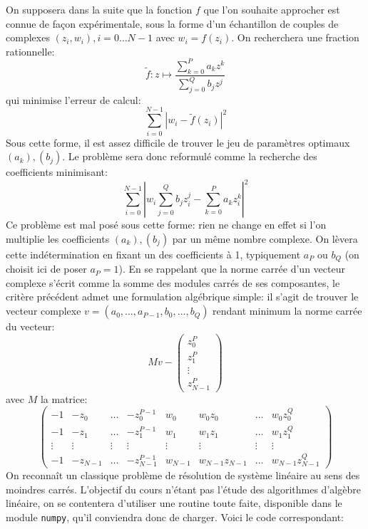 On supposera dans la suite que la fonction $f$ que l'on souhaite approcher est connue de façon expérimentale, sous la forme d'un échantillon de couples de complexes $(z_i,w_i), i=0 \dots N-1$ avec $w_i = f\left(z_i\right)$. On recherchera une fraction rationnelle:
\[
\widetilde{f} \colon z \mapsto \frac{\sum_{k=0}^P a_k z^k}{\sum_{j=0}^Q b_j z^j}
\]
qui minimise l'erreur de calcul:
\[
\sum_{i=0}^{N-1} \left|w_i - \widetilde{f}(z_i)\right|^2
\] 
Sous cette forme, il est assez difficile de trouver le jeu de paramètres optimaux $(a_k),(b_j)$. Le problème sera donc reformulé comme la recherche des coefficients minimisant:
\[
\sum_{i=0}^{N-1} \left|w_i \sum_{j=0}^Q b_j z_i^j - 
\sum_{k=0}^P a_k z_i^k \right|^2
\] 
Ce problème est mal posé sous cette forme: rien ne change en effet si l'on multiplie les coefficients  $(a_k),(b_j)$ par un même nombre complexe. On lèvera cette indétermination en fixant un des coefficients à 1, typiquement $a_P$ ou $b_Q$ (on choisit ici de poser $a_P=1$). En se rappelant que la norme carrée d'un vecteur complexe s'écrit comme la somme des modules carrés de ses composantes, le critère précédent admet une formulation algébrique simple: il s'agit de trouver le vecteur complexe $v=(a_0, \dots,a_{P-1},b_0, \dots, b_Q)$ rendant minimum la norme carrée du vecteur:
\[
M v - 
\left(
\begin{array}{c}
z_0^P \\
z_1^P \\ 
\vdots \\ 
z_{N-1}^P
\end{array}
\right)
\]
avec $M$ la matrice:
\[
\left(
\begin{array}{cccccccc}
-1 & -z_0 & \dots & -z_0^{P-1} & w_0 & w_0 z_0 & \dots & w_0 z_0^Q
 \\
-1 & -z_1 & \dots & -z_1^{P-1} & w_1 & w_1 z_1 & \dots & w_1 z_1^Q \\
\vdots & \vdots & \vdots & \vdots &\vdots & \vdots & \vdots & \vdots  \\
-1 & -z_{N-1} & \dots & -z_{N-1}^{P-1} & w_{N-1} & w_{N-1} z_{N-1} & \dots & w_{N-1} z_{N-1}^Q
\end{array}
\right)
\]
On reconnaît un classique problème de résolution de système linéaire au sens des moindres carrés. L'objectif du cours n'étant pas l'étude des algorithmes d'algèbre linéaire, on se contentera d'utiliser une routine toute faite, disponible dans le module \texttt{numpy}, qu'il conviendra donc de charger. Voici le code correspondant:
